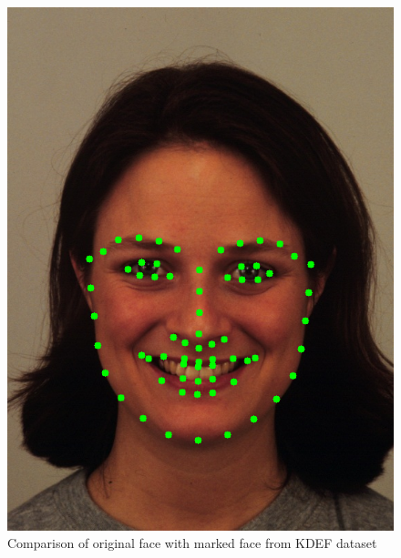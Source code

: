 \documentclass{Project}
\begin{document}
\begin{figure}[h!]
\begin{minipage}[b]{0.4\linewidth}
    \includegraphics[width=\linewidth]{AF01HAS_annotated.png}
  \end{minipage}
  \caption{Comparison of original face with marked face from KDEF dataset}
  \label{fig:happyReal1}
\end{figure}
\end{document}
